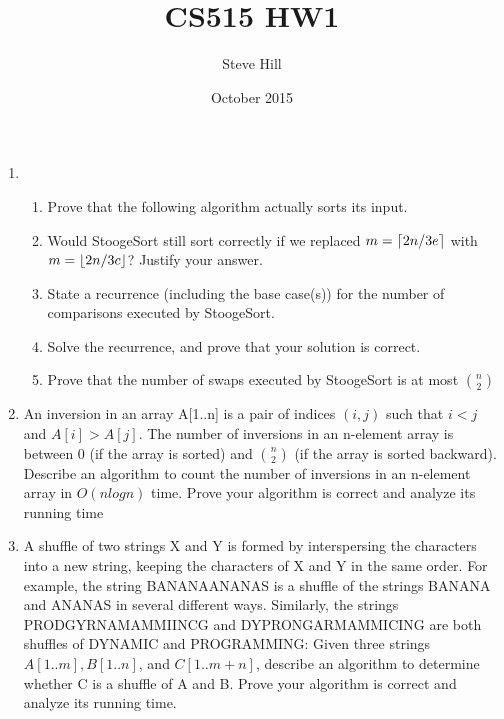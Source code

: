 \documentclass{article}
\title{CS515 HW1}
\author{Steve Hill}
\date{October 2015}
\DeclarePairedDelimiter{\ceil}{\lceil}{\rceil}
\DeclarePairedDelimiter{\floor}{\lfloor}{\rfloor}
\begin{document}
\maketitle

\begin{enumerate}
\item 
    \begin{enumerate}
    \item 
    Prove that the following algorithm actually sorts its input.

    \item
    Would StoogeSort still sort correctly if we replaced $m = \ceil{2n/3e}$ with $m = \floor{2n/3c}$? Justify
your answer.
 
    \item
    State a recurrence (including the base case(s)) for the number of comparisons executed by
StoogeSort.

    \item 
    Solve the recurrence, and prove that your solution is correct. 

    \item
    Prove that the number of swaps executed by StoogeSort is at most $n \choose 2$

    \end{enumerate}

\item 
An inversion in an array A[1..n] is a pair of indices $(i, j)$ such that $i < j$ and
$A[i] > A[j]$. The number of inversions in an n-element array is between 0 (if the array is sorted)
and $n \choose 2$ (if the array is sorted backward). Describe an algorithm to count the number of inversions
in an n-element array in $O(n log n)$ time. Prove your algorithm is correct and analyze its running
time


\item 
A shuffle of two strings X and Y is formed by interspersing the characters into a new string,
keeping the characters of X and Y in the same order. For example, the string BANANAANANAS
is a shuffle of the strings BANANA and ANANAS in several different ways.
Similarly, the strings PRODGYRNAMAMMIINCG and DYPRONGARMAMMICING are both
shuffles of DYNAMIC and PROGRAMMING:
Given three strings $A[1..m], B[1..n]$, and $C[1..m + n]$, describe an algorithm to determine
whether C is a shuffle of A and B. Prove your algorithm is correct and analyze its running time.


\end{enumerate}
\end{document}
